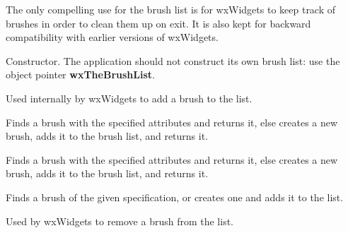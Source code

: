 The only compelling use for the brush list is for wxWidgets to keep
track of brushes in order to clean them up on exit. It is also kept for
backward compatibility with earlier versions of wxWidgets.




\label{wxbrushlistconstr}


Constructor. The application should not construct its own brush list:
use the object pointer {\bf wxTheBrushList}.

\label{wxbrushlistaddbrush}


Used internally by wxWidgets to add a brush to the list.

\label{wxbrushlistfindorcreatebrush}


Finds a brush with the specified attributes and returns it, else creates a new brush, adds it
to the brush list, and returns it.


Finds a brush with the specified attributes and returns it, else creates a new brush, adds it
to the brush list, and returns it.

Finds a brush of the given specification, or creates one and adds it to the list.





\label{wxbrushlistremovebrush}


Used by wxWidgets to remove a brush from the list.



